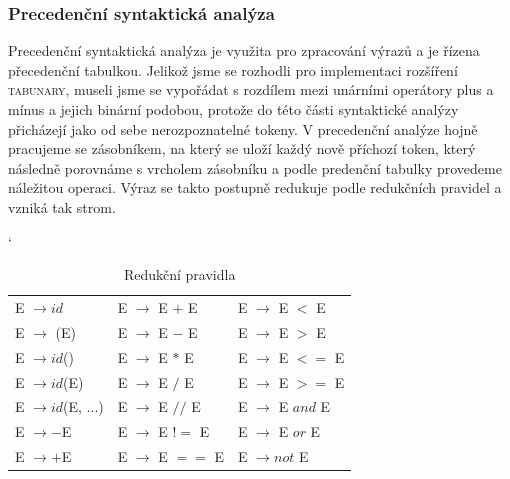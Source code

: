 \documentclass[12pt]{article}
\begin{document}
\subsubsection{Precedenční syntaktická analýza}
Precedenční syntaktická analýza je využita pro zpracování výrazů a je řízena přecedenční tabulkou. Jelikož jsme se rozhodli pro implementaci rozšíření \textsc{tabunary}, museli jsme se vypořádat s rozdílem mezi unárními operátory plus a mínus a jejich binární podobou, protože do této části syntaktické analýzy přicházejí jako od sebe nerozpoznatelné tokeny.
V precedenční analýze hojně pracujeme se zásobníkem, na který se uloží každý nově příchozí token, který následně porovnáme s vrcholem zásobníku a podle predenční tabulky provedeme náležitou operaci. Výraz se takto postupně redukuje podle redukčních pravidel a vzniká tak strom. 
\begin{table}[!htbp]
\catcode`
\centering
    \begin{tabular}{l l l}
         E $\rightarrow id$ & E $\rightarrow$ E $+$ E & E $\rightarrow$ E $<$ E \\
         E $\rightarrow $ (E) & E $\rightarrow$ E $-$ E & E $\rightarrow$ E $>$ E \\
         E $\rightarrow id$() & E $\rightarrow$ E $*$ E & E $\rightarrow$ E $<=$ E \\
         E $\rightarrow id$(E) & E $\rightarrow$ E $/$ E & E $\rightarrow$ E $>=$ E \\
         E $\rightarrow id$(E, ...) & E $\rightarrow$ E $//$ E & E $\rightarrow$ E $and$ E \\
         E $\rightarrow -$E & E $\rightarrow$ E $!=$ E & E $\rightarrow$ E $or$ E \\
         E $\rightarrow +$E & E $\rightarrow$ E $==$ E & E $\rightarrow not$ E \\
    \end{tabular}
    \caption{Redukční pravidla}
    \label{tab:1}
\end{table}
\end{document}
